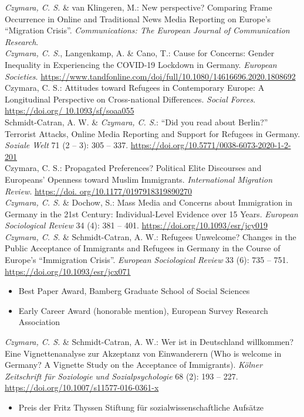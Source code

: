 \documentclass[11pt, a4paper]{article}
\newcommand{\years}[1]{\marginnote{~~#1}}
\begin{document}
\years{2020}\textit{Czymara, C. S.} \& van Klingeren, M.: New perspective? Comparing Frame Occurrence in Online and Traditional News Media Reporting on Europe's ``Migration Crisis''. \textit{Communications: The European Journal of Communication Research}.\\
\textit{Czymara, C. S.}, Langenkamp, A. \& Cano, T.: Cause for Concerns: Gender Inequality in Experiencing the COVID-19 Lockdown in Germany. \textit{European Societies}. \href{https://www.tandfonline.com/doi/full/10.1080/14616696.2020.1808692}{https://www.tandfonline.com/doi/full/10.1080/14616696.2020.1808692}\\
Czymara, C. S.: Attitudes toward Refugees in Contemporary Europe: A Longitudinal Perspective on Cross-national Differences. \textit{Social Forces}. \href{https://doi.org/10.1093/sf/soaa055}{https://doi.org/ 10.1093/sf/soaa055}\\
Schmidt-Catran, A. W. \& \textit{Czymara, C. S.}: ``Did you read about Berlin?'' Terrorist Attacks, Online Media Reporting and Support for Refugees in Germany. \textit{Soziale Welt} 71 (2 -- 3): 305 -- 337. \href{https://doi.org/10.5771/0038-6073-2020-1-2-201}{https://doi.org/10.5771/0038-6073-2020-1-2-201}\\
\years{2019}Czymara, C. S.: Propagated Preferences? Political Elite Discourses and Europeans’ Openness toward Muslim Immigrants. \textit{International Migration Review}. \href{https://doi.org/10.1177/0197918319890270}{https://doi. org/10.1177/0197918319890270}\\
\years{2018}\textit{Czymara, C. S.} \& Dochow, S.: Mass Media and Concerns about Immigration in Germany in the 21st Century: Individual-Level Evidence over 15 Years. \textit{European Sociological Review} 34 (4): 381 -- 401. \href{https://doi.org/10.1093/esr/jcy019}{https://doi.org/10.1093/esr/jcy019}\\
\years{2017}\textit{Czymara, C. S.} \& Schmidt-Catran, A. W.: Refugees Unwelcome? Changes in the Public Acceptance of Immigrants and Refugees in Germany in the Course of Europe's ``Immigration Crisis''. \textit{European Sociological Review} 33 (6): 735 -- 751. \href{https://doi.org/10.1093/esr/jcx071}{https://doi.org/10.1093/esr/jcx071}
\begin{itemize}[noitemsep,nolistsep]
	\item Best Paper Award, Bamberg Graduate School of Social Sciences
	\item Early Career Award (honorable mention), European Survey Research Association
\end{itemize}
\years{2016}\textit{Czymara, C. S.} \& Schmidt-Catran, A. W.: Wer ist in Deutschland willkommen? Eine Vignettenanalyse zur Akzeptanz von Einwanderern (Who is welcome in Germany? A Vignette Study on the Acceptance of Immigrants). \textit{K\"olner Zeitschrift f\"ur Soziologie und Sozialpsychologie} 68 (2): 193 -- 227. \href{https://doi.org/10.1007/s11577-016-0361-x}{https://doi.org/10.1007/s11577-016-0361-x}
\begin{itemize}[nolistsep]
	\item Preis der Fritz Thyssen Stiftung für sozialwissenschaftliche Aufsätze
\end{itemize}
\hspace{1em}
\end{document}
